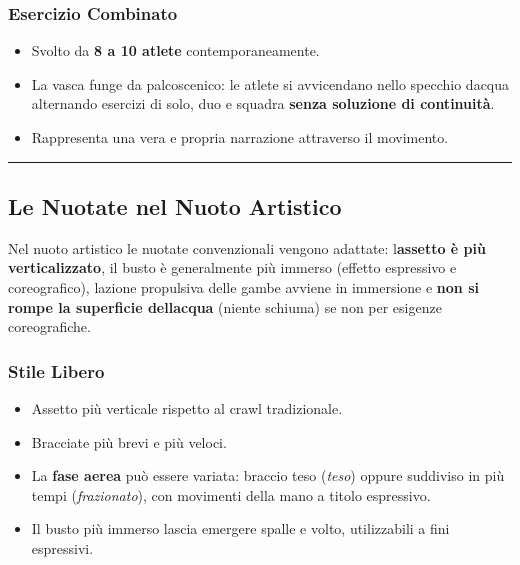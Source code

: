 \documentclass[a4paper,11pt]{article}
\providecommand{\tightlist}{%
  \setlength{\itemsep}{0pt}\setlength{\parskip}{0pt}}
\begin{document}
\subsubsection{Esercizio Combinato}\label{esercizio-combinato}

\begin{itemize}
      \tightlist
      \item
            Svolto da \textbf{8 a 10 atlete} contemporaneamente.
      \item
            La vasca funge da palcoscenico: le atlete si avvicendano nello
            specchio d\textquotesingle acqua alternando esercizi di solo, duo e
            squadra \textbf{senza soluzione di continuità}.
      \item
            Rappresenta una vera e propria narrazione attraverso il movimento.
\end{itemize}

\begin{center}\rule{0.5\linewidth}{0.5pt}\end{center}

\subsection{Le Nuotate nel Nuoto
      Artistico}\label{le-nuotate-nel-nuoto-artistico}

Nel nuoto artistico le nuotate convenzionali vengono adattate:
l\textquotesingle{}\textbf{assetto è più verticalizzato}, il busto è
generalmente più immerso (effetto espressivo e coreografico),
l\textquotesingle azione propulsiva delle gambe avviene in immersione e
\textbf{non si rompe la superficie dell\textquotesingle acqua} (niente
schiuma) se non per esigenze coreografiche.

\subsubsection{Stile Libero}\label{stile-libero}

\begin{itemize}
      \tightlist
      \item
            Assetto più verticale rispetto al crawl tradizionale.
      \item
            Bracciate più brevi e più veloci.
      \item
            La \textbf{fase aerea} può essere variata: braccio teso (\emph{teso})
            oppure suddiviso in più tempi (\emph{frazionato}), con movimenti della
            mano a titolo espressivo.
      \item
            Il busto più immerso lascia emergere spalle e volto, utilizzabili a
            fini espressivi.
\end{itemize}
\end{document}
